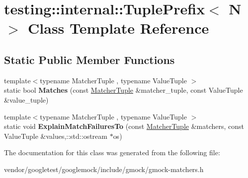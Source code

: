 \hypertarget{classtesting_1_1internal_1_1TuplePrefix}{}\section{testing\+:\+:internal\+:\+:Tuple\+Prefix$<$ N $>$ Class Template Reference}
\label{classtesting_1_1internal_1_1TuplePrefix}
\subsection*{Static Public Member Functions}
\begin{DoxyCompactItemize}
\item 
{\footnotesize template$<$typename Matcher\+Tuple , typename Value\+Tuple $>$ }\\static bool {\bfseries Matches} (const \hyperlink{structtesting_1_1internal_1_1MatcherTuple}{Matcher\+Tuple} \&matcher\+\_\+tuple, const Value\+Tuple \&value\+\_\+tuple)\hypertarget{classtesting_1_1internal_1_1TuplePrefix_ada24ceee73c02e3bb7f8264143170f7a}{}\label{classtesting_1_1internal_1_1TuplePrefix_ada24ceee73c02e3bb7f8264143170f7a}

\item 
{\footnotesize template$<$typename Matcher\+Tuple , typename Value\+Tuple $>$ }\\static void {\bfseries Explain\+Match\+Failures\+To} (const \hyperlink{structtesting_1_1internal_1_1MatcherTuple}{Matcher\+Tuple} \&matchers, const Value\+Tuple \&values,\+::std\+::ostream $\ast$os)\hypertarget{classtesting_1_1internal_1_1TuplePrefix_af983f3f9254408e6dabe67b511dd22ae}{}\label{classtesting_1_1internal_1_1TuplePrefix_af983f3f9254408e6dabe67b511dd22ae}

\end{DoxyCompactItemize}


The documentation for this class was generated from the following file\+:\begin{DoxyCompactItemize}
\item 
vendor/googletest/googlemock/include/gmock/gmock-\/matchers.\+h\end{DoxyCompactItemize}
